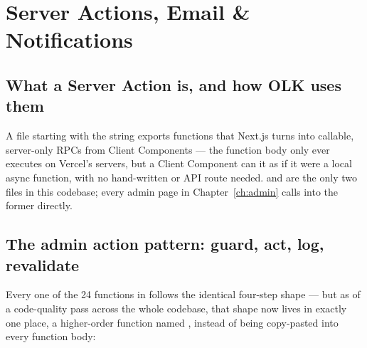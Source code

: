 \chapter{Server Actions, Email \& Notifications}
\label{ch:server-actions}

\section{What a Server Action is, and how OLK uses them}

A file starting with the string  exports functions that Next.js turns into callable, server-only RPCs from Client Components — the function body only ever executes on Vercel's servers, but a Client Component can  it as if it were a local async function, with no hand-written  or API route needed.  and  are the only two  files in this codebase; every admin page in Chapter~\ref{ch:admin} calls into the former directly.

\section{The admin action pattern: guard, act, log, revalidate}

Every one of the 24 functions in  follows the identical four-step shape — but as of a code-quality pass across the whole codebase, that shape now lives in exactly one place, a higher-order function named , instead of being copy-pasted into every function body:

